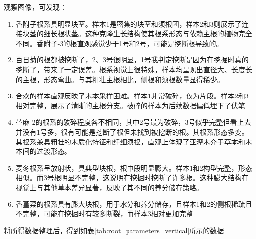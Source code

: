 \documentclass[10.5pt]{config}
\begin{document}
\newpage

\hspace{2em}观察图像，可发现：
\begin{enumerate}
    \item 香附子根系具明显块茎。样本1是密集的块茎和须根团，样本2和3则展示了连接块茎的细长根状茎。这种克隆生长结构使其根系形态与依赖主根的植物完全不同。香附子-3的根直观感觉少于1号和2号，可能是挖断根导致的。
    \item 百日菊的根都被挖断了，2、3号很明显，1号我判定挖断是因为在挖掘时真的挖断了，带来了一定误差。根系视觉上很特殊，样本均呈现出直径大、长度长的主根，形态弯曲。与其粗壮主根相比，侧根和须根数量显得稀少。
    \item 合欢的样本直观反映了木本采样困难。样本1非常破碎，仅为片段。样本2和3相对完整，展示了清晰的主根分支。破碎的样本为后续数据偏低埋下了伏笔
    \item 苎麻-2的根系的破碎程度各不相同，其中2号最为破碎，3号似乎完整但看上去并没有1号多，很有可能是挖断了根但未找到被挖断的根。其根系形态多变。其根系兼具粗壮的木质化特征和纤细须根，直观上体现了亚灌木介于草本和木本间的过渡形态。
    \item 麦冬根系呈放射状，具典型块根，根中段明显膨大。样本1和2构型完整，形态相似。而3号根明显不完整，这说明在挖掘时挖断了许多根。这种膨大结构在视觉上与其他草本差异显著，反映了其不同的养分储存策略。
    \item 香堇菜的根系具有膨大块根，用于水分和养分储存，且样本1和2的侧根稀疏且不完整，可能在挖掘时有较多断裂，而样本3相对更加完整
\end{enumerate}

\newpage

将所得数据整理后，得到如表\ref{tab:root_parameters_vertical}所示的数据
\end{document}
